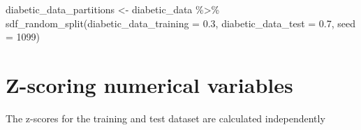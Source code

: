 \documentclass[
]{article}
\newenvironment{Shaded}{\begin{snugshade}}{\end{snugshade}}
\newcommand{\AttributeTok}[1]{\textcolor[rgb]{0.77,0.63,0.00}{#1}}
\newcommand{\DecValTok}[1]{\textcolor[rgb]{0.00,0.00,0.81}{#1}}
\newcommand{\FloatTok}[1]{\textcolor[rgb]{0.00,0.00,0.81}{#1}}
\newcommand{\FunctionTok}[1]{\textcolor[rgb]{0.00,0.00,0.00}{#1}}
\newcommand{\NormalTok}[1]{#1}
\newcommand{\OtherTok}[1]{\textcolor[rgb]{0.56,0.35,0.01}{#1}}
\newcommand{\SpecialCharTok}[1]{\textcolor[rgb]{0.00,0.00,0.00}{#1}}
\begin{document}
\begin{Shaded}
\begin{Highlighting}[]
\NormalTok{diabetic\_data\_partitions }\OtherTok{\textless{}{-}}\NormalTok{ diabetic\_data }\SpecialCharTok{\%\textgreater{}\%}
  \FunctionTok{sdf\_random\_split}\NormalTok{(}\AttributeTok{diabetic\_data\_training =} \FloatTok{0.3}\NormalTok{, }\AttributeTok{diabetic\_data\_test =} \FloatTok{0.7}\NormalTok{, }\AttributeTok{seed =} \DecValTok{1099}\NormalTok{)}
\end{Highlighting}
\end{Shaded}

\hypertarget{z-scoring-numerical-variables}{%
\section{Z-scoring numerical
variables}\label{z-scoring-numerical-variables}}

The z-scores for the training and test dataset are calculated
independently
\end{document}
